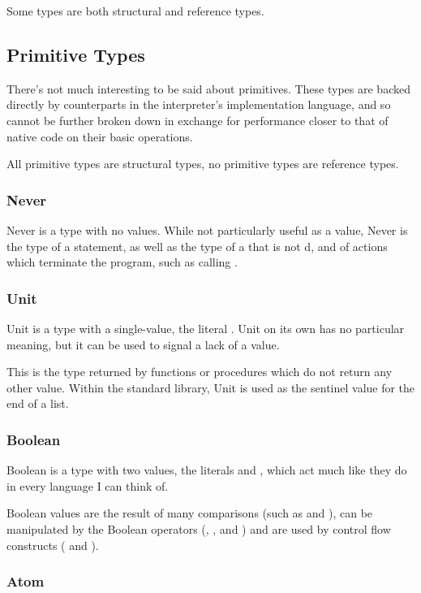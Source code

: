 Some types are both structural and reference types.

\subsection{Primitive Types}

There's not much interesting to be said about primitives. These types are
backed directly by counterparts in the interpreter's implementation language,
and so cannot be further broken down in exchange for performance closer to
that of native code on their basic operations.

All primitive types are structural types, no primitive types are reference
types.

\subsubsection{Never}

Never is a type with no values. While not particularly useful as a value,
Never is the type of a  statement, as well as the type of
a  that is not d, and of actions which terminate the
program, such as calling .

\subsubsection{Unit}

Unit is a type with a single-value, the literal . Unit on its own
has no particular meaning, but it can be used to signal a lack of a value.

This is the type returned by functions or procedures which do not return
any other value. Within the standard library, Unit is used as the sentinel
value for the end of a list.

\subsubsection{Boolean}

Boolean is a type with two values, the literals  and ,
which act much like they do in every language I can think of.

Boolean values are the result of many comparisons (such as \op{<} and
\op{>}), can be manipulated by the Boolean operators (, ,
and ) and are used by control flow constructs ( and
).

\subsubsection{Atom}

